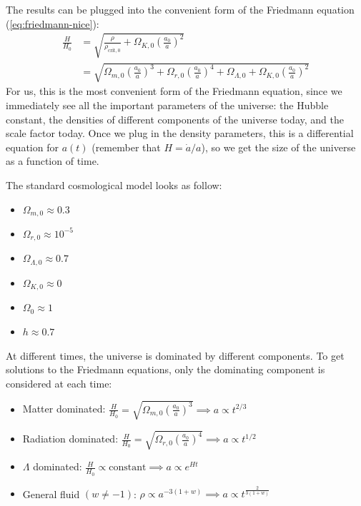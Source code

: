 The results can be plugged into the convenient form of the Friedmann equation (\ref{eq:friedmann-nice}):
\begin{align*}
	\frac{H}{H_0} 
	&= \sqrt{\frac{\rho}{\rho_{\text{crit}, 0}} + \Omega_{K,0} \left( \frac{a_0}{a} \right)^2 }\\
	&= \sqrt{
		\Omega_{m,0} \left( \frac{a_0}{a} \right)^3
		+ \Omega_{r,0} \left( \frac{a_0}{a} \right)^4
		+ \Omega_{\Lambda,0}
		+ \Omega_{K,0} \left( \frac{a_0}{a} \right)^2
	}
\end{align*}
For us, this is the most convenient form of the Friedmann equation, since we immediately see all the important parameters of the universe: the Hubble constant, the densities of different components of the universe today, and the scale factor today.
Once we plug in the density parameters, this is a differential equation for $a(t)$ (remember that $H = \dot{a}/a$), so we get the size of the universe as a function of time.

The standard cosmological model looks as follow:
\begin{itemize}
	\item $\Omega_{m,0} \approx 0.3$
	\item $\Omega_{r,0} \approx 10^{-5}$
	\item $\Omega_{\Lambda,0} \approx 0.7$
	\item $\Omega_{K,0} \approx 0$
	\item $\Omega_0 \approx 1$
	\item $h \approx 0.7$
\end{itemize}

At different times, the universe is dominated by different components.
To get solutions to the Friedmann equations, only the dominating component is considered at each time:
\begin{itemize}[nolistsep, noitemsep]
	\item Matter dominated:
	$
		\displaystyle
		\frac{H}{H_0} = \sqrt{\Omega_{m,0} \left( \frac{a_0}{a}\right)^3}
		\implies a \propto t^{2/3}
	$
	\item Radiation dominated:
	$
		\displaystyle
		\frac{H}{H_0} = \sqrt{\Omega_{r,0} \left( \frac{a_0}{a} \right)^4}
		\implies a \propto t^{1/2}
	$
	\item $\Lambda$ dominated:
	$
		\displaystyle
		\frac{H}{H_0} \propto \text{constant}
		\implies a \propto e^{H t}
	$
	\item General fluid $(w \neq -1)$:
	$
		\displaystyle
		\rho \propto a^{-3(1+w)} \implies a \propto t^{\frac{2}{3(1+w)}}
	$
\end{itemize}


